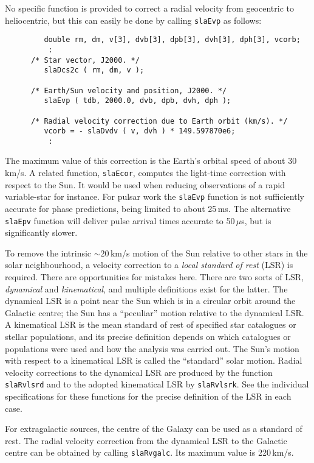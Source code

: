 \documentclass[11pt,fleqn,twoside]{article}
\renewcommand{\_}{{\tt\char'137}}     %
\begin{document}
No specific function is provided to correct a radial velocity
from geocentric to heliocentric, but this can easily be done by calling
{\tt slaEvp}
as follows:
\goodbreak
\vspace{-3ex}
\begin{verbatim}
         double rm, dm, v[3], dvb[3], dpb[3], dvh[3], dph[3], vcorb;
          :
      /* Star vector, J2000. */
         slaDcs2c ( rm, dm, v );
 
      /* Earth/Sun velocity and position, J2000. */
         slaEvp ( tdb, 2000.0, dvb, dpb, dvh, dph );
 
      /* Radial velocity correction due to Earth orbit (km/s). */
         vcorb = - slaDvdv ( v, dvh ) * 149.597870e6;
          :
\end{verbatim}
\vspace{-3ex}
\goodbreak
The maximum value of this correction is the Earth's orbital speed
of about 30\,km/s.  A related function,
{\tt slaEcor},
computes the light-time correction with respect to the Sun.  It
would be used when reducing observations of a rapid variable-star
for instance.
For pulsar work the
{\tt slaEvp} function is not sufficiently accurate for
phase predictions, being limited to about 25\,ms.  The
alternative
{\tt slaEpv} function will deliver pulse arrival times
accurate to 50\,$\mu$s, but is significantly slower.
 
To remove the intrinsic $\sim20$\,km/s motion of the Sun relative
to other stars in the solar neighbourhood,
a velocity correction to a
{\it local standard of rest}\/ (LSR) is required.  There are
opportunities for mistakes here.  There are two sorts of LSR,
{\it dynamical}\/ and {\it kinematical}, and
multiple definitions exist for the latter.  The
dynamical LSR is a point near the Sun which is in a circular
orbit around the Galactic centre;  the Sun has a ``peculiar''
motion relative to the dynamical LSR.  A kinematical LSR is
the mean standard of rest of specified star catalogues or stellar
populations, and its precise definition depends on which
catalogues or populations were used and how the analysis was
carried out.  The Sun's motion with respect to a kinematical
LSR is called the ``standard'' solar motion.  Radial
velocity corrections to the dynamical LSR are produced by the function
{\tt slaRvlsrd}
and to the adopted kinematical LSR by
{\tt slaRvlsrk}.
See the individual specifications for these functions for the
precise definition of the LSR in each case.
 
For extragalactic sources, the centre of the Galaxy can be used as
a standard of rest.  The radial velocity correction from the
dynamical LSR to the Galactic centre can be obtained by calling
{\tt slaRvgalc}.
Its maximum value is 220\,km/s.
 
\end{document}
